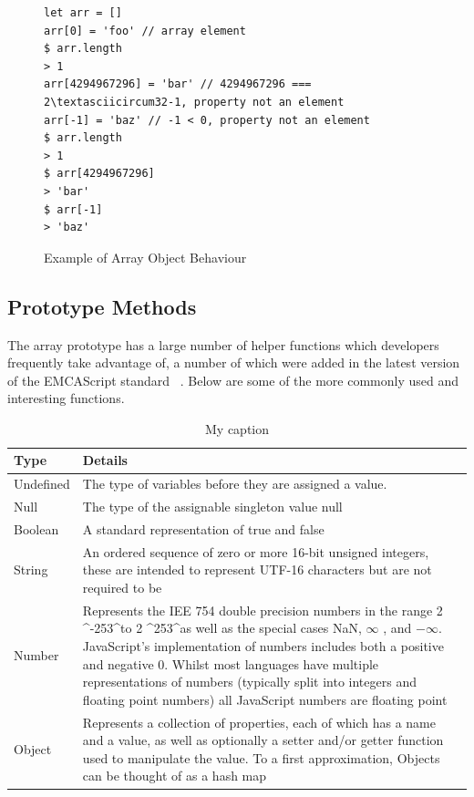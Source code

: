 \documentclass[]{final_report}
\begin{document}
\begin{figure}[h]
\begin{verbatim}
let arr = []
arr[0] = 'foo' // array element
$ arr.length
> 1
arr[4294967296] = 'bar' // 4294967296 === 2\textasciicircum32-1, property not an element
arr[-1] = 'baz' // -1 < 0, property not an element
$ arr.length
> 1
$ arr[4294967296]
> 'bar'
$ arr[-1]
> 'baz'
\end{verbatim}
\caption{\label{fig:js-array-max-length} Example of Array Object Behaviour }
\end{figure}

\subsection{Prototype Methods}
The array prototype has a large number of helper functions which developers frequently take advantage of, a number of which were added in the latest version of the EMCAScript standard ~\cite{EcmaScript}. Below are some of the more commonly used and interesting functions.

\begin{table}[]
\centering
\caption{My caption}
\label{my-label}
\begin{tabular}{|l|l|}
\hline
Type & Details \\ \hline
Undefined & The type of variables before they are assigned a value. \\ \hline
Null & The type of the assignable singleton value null\\ \hline
Boolean & A standard representation of true and false \\ \hline
String & An ordered sequence of zero or more 16-bit unsigned integers, these are intended to represent UTF-16 characters but are not required to be \\ \hline
Number & Represents the IEE 754 double precision numbers in the range 2 \textasciicircum -253\textasciicircum  to 2 \textasciicircum 253\textasciicircum  as well as the special cases NaN, $\infty$ , and $ -\infty$. JavaScript's implementation of numbers includes both a positive and negative 0. Whilst most languages have multiple representations of numbers (typically split into integers and floating point numbers) all JavaScript numbers are floating point \\ \hline
Object & Represents a collection of properties, each of which has a name and a value, as well as optionally a setter and/or getter function used to manipulate the value. To a first approximation, Objects can be thought of as a hash map \\ \hline
\end{tabular}
\end{table}
\end{document}
